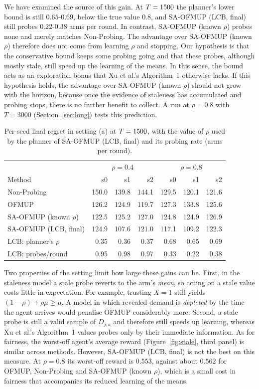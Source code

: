 \documentclass[letterpaper]{article}
\begin{document}
We have examined the source of this gain. At $T=1500$ the planner's lower bound
is still $0.65$-$0.69$, below the true value $0.8$, and SA-OFMUP (LCB, final)
still probes $0.22$-$0.38$ arms per round. In contrast, SA-OFMUP (known $\rho$)
probes none and merely matches Non-Probing. The advantage over SA-OFMUP (known
$\rho$) therefore does not come from learning $\rho$ and stopping. Our
hypothesis is that the conservative bound keeps some probing going and that
these probes, although mostly stale, still speed up the learning of the means.
In this sense, the bound acts as an exploration bonus that Xu et al.'s
Algorithm~1 otherwise lacks. If this hypothesis holds, the advantage over
SA-OFMUP (known $\rho$) should not grow with the horizon, because once the
evidence of staleness has accumulated and probing stops, there is no further
benefit to collect. A run at $\rho=0.8$ with $T=3000$ (Section~\ref{sec:long})
tests this prediction.

\begin{table}[t]
\caption{Per-seed final regret in setting (a) at $T=1500$, with the value of $\rho$ used by the planner of SA-OFMUP (LCB, final) and its probing rate (arms per round).}
\label{tab:seeds}
\centering\footnotesize\setlength{\tabcolsep}{4pt}
\begin{tabular}{lrrrrrr}
\toprule
 & \multicolumn{3}{c}{$\rho=0.4$} & \multicolumn{3}{c}{$\rho=0.8$} \\
Method & s0 & s1 & s2 & s0 & s1 & s2 \\
\midrule
Non-Probing & 150.0 & 139.8 & 144.1 & 129.5 & 120.1 & 121.6 \\
OFMUP & 126.2 & 124.9 & 119.7 & 127.3 & 133.8 & 125.6 \\
SA-OFMUP (known $\rho$) & 122.5 & 125.2 & 127.0 & 124.8 & 124.9 & 126.9 \\
SA-OFMUP (LCB, final) & 124.9 & 107.6 & 121.0 & 117.1 & 109.2 & 122.3 \\
\midrule
LCB: planner's $\rho$ & 0.35 & 0.36 & 0.37 & 0.68 & 0.65 & 0.69 \\
LCB: probes/round & 0.95 & 0.98 & 0.97 & 0.33 & 0.22 & 0.38 \\
\bottomrule
\end{tabular}
\end{table}

Two properties of the setting limit how large these gains can be. First, in the
staleness model a stale probe reverts to the arm's \emph{mean}, so acting on a
stale value costs little in expectation. For example, trusting $X=1$ still
yields $(1-\rho)+\rho\mu\ge\mu$. A model in which revealed demand is
\emph{depleted} by the time the agent arrives would penalise OFMUP considerably
more. Second, a stale probe is still a valid sample of $D_{j,a}$ and therefore
still speeds up learning, whereas Xu et al.'s Algorithm~1 values probes only by
their immediate information. As for fairness, the worst-off agent's average
reward (Figure~\ref{fig:stale}, third panel) is similar across methods. However,
SA-OFMUP (LCB, final) is not the best on this measure. At $\rho=0.8$ its
worst-off reward is $0.553$, against about $0.562$ for OFMUP, Non-Probing and
SA-OFMUP (known $\rho$), which is a small cost in fairness that accompanies its
reduced learning of the means.
\end{document}
